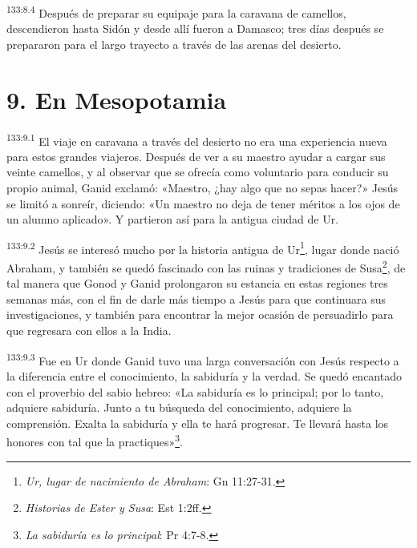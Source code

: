 \par
\textsuperscript{133:8.4} Después de preparar su equipaje para la caravana de camellos, descendieron hasta Sidón y desde allí fueron a Damasco; tres días después se prepararon para el largo trayecto a través de las arenas del desierto.

\section*{9. En Mesopotamia}
\par
\textsuperscript{133:9.1} El viaje en caravana a través del desierto no era una experiencia nueva para estos grandes viajeros. Después de ver a su maestro ayudar a cargar sus veinte camellos, y al observar que se ofrecía como voluntario para conducir su propio animal, Ganid exclamó: «Maestro, ¿hay algo que no sepas hacer?» Jesús se limitó a sonreír, diciendo: «Un maestro no deja de tener méritos a los ojos de un alumno aplicado». Y partieron así para la antigua ciudad de Ur.

\par
\textsuperscript{133:9.2} Jesús se interesó mucho por la historia antigua de Ur\footnote{\textit{Ur, lugar de nacimiento de Abraham}: Gn 11:27-31.}, lugar donde nació Abraham, y también se quedó fascinado con las ruinas y tradiciones de Susa\footnote{\textit{Historias de Ester y Susa}: Est 1:2ff.}, de tal manera que Gonod y Ganid prolongaron su estancia en estas regiones tres semanas más, con el fin de darle más tiempo a Jesús para que continuara sus investigaciones, y también para encontrar la mejor ocasión de persuadirlo para que regresara con ellos a la India.

\par
\textsuperscript{133:9.3} Fue en Ur donde Ganid tuvo una larga conversación con Jesús respecto a la diferencia entre el conocimiento, la sabiduría y la verdad. Se quedó encantado con el proverbio del sabio hebreo: «La sabiduría es lo principal; por lo tanto, adquiere sabiduría. Junto a tu búsqueda del conocimiento, adquiere la comprensión. Exalta la sabiduría y ella te hará progresar. Te llevará hasta los honores con tal que la practiques»\footnote{\textit{La sabiduría es lo principal}: Pr 4:7-8.}.

